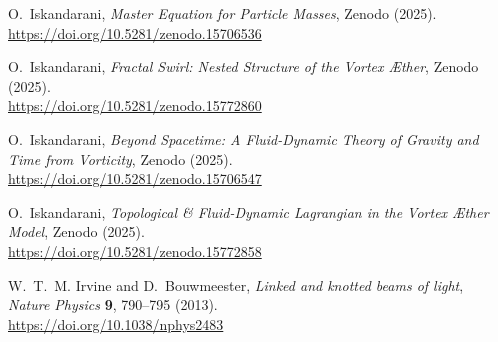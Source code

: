 \documentclass[a4paper,12pt]{article}
\begin{document}
\begin{thebibliography}{15}
            O.~Iskandarani, \emph{Master Equation for Particle Masses}, Zenodo (2025).\\
            \url{https://doi.org/10.5281/zenodo.15706536}

            O.~Iskandarani, \emph{Fractal Swirl: Nested Structure of the Vortex Æther}, Zenodo (2025).\\
            \url{https://doi.org/10.5281/zenodo.15772860}

            O.~Iskandarani, \emph{Beyond Spacetime: A Fluid-Dynamic Theory of Gravity and Time from Vorticity}, Zenodo (2025).\\
            \url{https://doi.org/10.5281/zenodo.15706547}

            O.~Iskandarani, \emph{Topological \& Fluid-Dynamic Lagrangian in the Vortex Æther Model}, Zenodo (2025).\\
            \url{https://doi.org/10.5281/zenodo.15772858}

            W.~T.~M. Irvine and D.~Bouwmeester, \emph{Linked and knotted beams of light},\\
            \emph{Nature Physics} \textbf{9}, 790–795 (2013).\\
            \url{https://doi.org/10.1038/nphys2483}

        \end{thebibliography}
\end{document}
